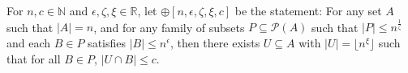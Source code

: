 
        \begin{definition} \label{def:n_large_enough_property}
            For $n, c \in \mathbb{N}$ and $\epsilon, \zeta, \xi \in \mathbb{R}$, let $\oplus[n, \epsilon, \zeta, \xi, c]$ be
            the statement:
            For any set $A$ such that $|A| = n$, and for any family of subsets $P \subseteq \mathcal{P}(A)$ such that
            $|P| \leq n^{\frac{1}{\zeta}}$ and each $B \in P$ satisfies $|B| \leq n^\epsilon$, then there exists $U \subseteq A$
            with $|U| = \lfloor n^\xi \rfloor$ such that for all $B \in P$, $|U \cap B| \leq c$.
        \end{definition}

